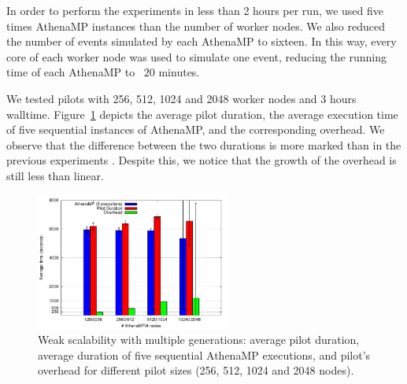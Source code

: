 In order to perform the experiments in less than 2 hours per run, we
used five times AthenaMP instances than the number of worker nodes. %
We also reduced  the number of events
simulated by each AthenaMP to sixteen.
In this way, every core of each worker node was used to simulate one event,
reducing the running time of each AthenaMP to ~$20$ minutes. %

We tested
pilots
with 256, 512, 1024 and 2048 worker nodes and
3 hours walltime. Figure~\ref{fig:weakScal2a} depicts the average
pilot duration, the average execution time of five sequential
instances of AthenaMP, and the corresponding overhead. We
observe that the difference between the two durations is more marked than in the
previous experiments . Despite
this, we
notice that the growth of the overhead is still less than linear.

\begin{figure}[!htb]
        \includegraphics[height=4.5cm,width=\columnwidth]{./figures/NGE/weak2.pdf}
    \caption{Weak scalability with multiple generations: average pilot
    duration, average duration of five sequential AthenaMP executions, and
    pilot's overhead for different pilot sizes (256, 512, 1024 and 2048 nodes).}
\label{fig:weakScal2a}
\end{figure}



